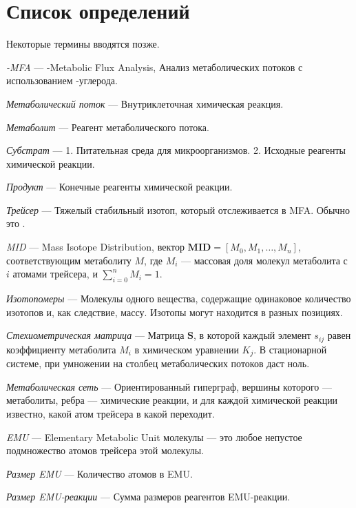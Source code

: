 \documentclass[14pt, a4paper]{extreport}
\begin{document}
\section{Список определений}
Некоторые термины вводятся позже.

\hangindent=1cm \noindent
\emph{-MFA} --- -Metabolic Flux Analysis, Анализ метаболических потоков с использованием -углерода.

\hangindent=1cm \noindent
\emph{Метаболический поток} --- Внутриклеточная химическая реакция.

\hangindent=1cm \noindent
\emph{Метаболит} --- Реагент метаболического потока.

\hangindent=1cm \noindent
\emph{Субстрат} --- 1. Питательная среда для микроорганизмов. 2. Исходные реагенты химической реакции.

\hangindent=1cm \noindent
\emph{Продукт} --- Конечные реагенты химической реакции.

\hangindent=1cm \noindent
\emph{Трейсер} --- Тяжелый стабильный изотоп, который отслеживается в MFA. Обычно это .

\hangindent=1cm \noindent
\emph{MID} --- Mass Isotope Distribution, вектор $\mathbf{MID} = [M_0, M_1, \ldots, M_n]$, соответствующим метаболиту $M$, где $M_i$ --- массовая доля молекул метаболита с $i$ атомами трейсера, и $\sum_{i = 0}^{n} M_i = 1$.

\hangindent=1cm \noindent
\emph{Изотопомеры} --- Молекулы одного вещества, содержащие одинаковое количество изотопов и, как следствие, массу. Изотопы могут находится в разных позициях.

\hangindent=1cm \noindent
\emph{Стехиометрическая матрица} --- Матрица $\mathbf{S}$, в которой каждый элемент $s_{ij}$ равен коэффициенту метаболита $M_i$ в химическом уравнении $K_j$. В стационарной системе, при умножении на столбец метаболических потоков даст ноль.

\hangindent=1cm \noindent
\emph{Метаболическая сеть} --- Ориентированный гиперграф, вершины которого --- метаболиты, ребра --- химические реакции, и для каждой химической реакции известно, какой атом трейсера в какой переходит.

\hangindent=1cm \noindent
\emph{EMU} --- Elementary Metabolic Unit молекулы --- это любое непустое подмножество атомов трейсера этой молекулы.

\hangindent=1cm \noindent
\emph{Размер EMU} --- Количество атомов в EMU.

\hangindent=1cm \noindent
\emph{Размер EMU-реакции} --- Сумма размеров реагентов EMU-реакции.
\end{document}
